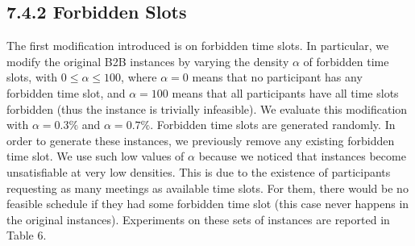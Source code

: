 \documentclass[10pt]{article}
\begin{document}
\subsection*{7.4.2 Forbidden Slots}
The first modification introduced is on forbidden time slots. In particular, we modify the original B2B instances by varying the density $\alpha$ of forbidden time slots, with $0 \leq \alpha \leq 100$, where $\alpha=0$ means that no participant has any forbidden time slot, and $\alpha=100$ means that all participants have all time slots forbidden (thus the instance is trivially infeasible). We evaluate this modification with $\alpha=0.3 \%$ and $\alpha=0.7 \%$. Forbidden time slots are generated randomly. In order to generate these instances, we previously remove any existing forbidden time slot. We use such low values of $\alpha$ because we noticed that instances become unsatisfiable at very low densities. This is due to the existence of participants requesting as many meetings as available time slots. For them, there would be no feasible schedule if they had some forbidden time slot (this case never happens in the original instances). Experiments on these sets of instances are reported in Table 6.
\end{document}
